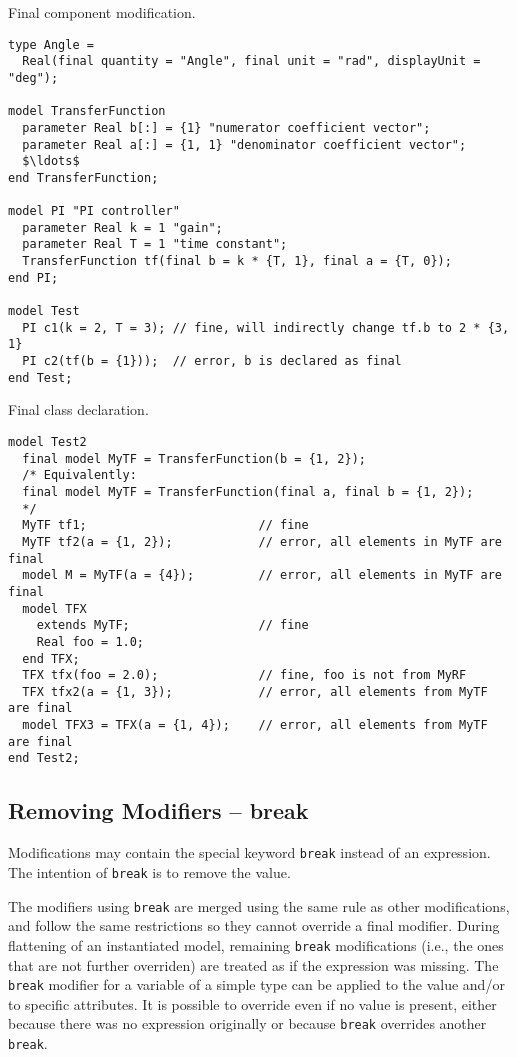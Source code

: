 \begin{example}
Final component modification.
\begin{lstlisting}[language=modelica]
type Angle =
  Real(final quantity = "Angle", final unit = "rad", displayUnit = "deg");

model TransferFunction
  parameter Real b[:] = {1} "numerator coefficient vector";
  parameter Real a[:] = {1, 1} "denominator coefficient vector";
  $\ldots$
end TransferFunction;

model PI "PI controller"
  parameter Real k = 1 "gain";
  parameter Real T = 1 "time constant";
  TransferFunction tf(final b = k * {T, 1}, final a = {T, 0});
end PI;

model Test
  PI c1(k = 2, T = 3); // fine, will indirectly change tf.b to 2 * {3, 1}
  PI c2(tf(b = {1}));  // error, b is declared as final
end Test;
\end{lstlisting}
\end{example}

\begin{example}
Final class declaration.
\begin{lstlisting}[language=modelica]
model Test2
  final model MyTF = TransferFunction(b = {1, 2});
  /* Equivalently:
  final model MyTF = TransferFunction(final a, final b = {1, 2});
  */
  MyTF tf1;                        // fine
  MyTF tf2(a = {1, 2});            // error, all elements in MyTF are final
  model M = MyTF(a = {4});         // error, all elements in MyTF are final
  model TFX
    extends MyTF;                  // fine
    Real foo = 1.0;
  end TFX;
  TFX tfx(foo = 2.0);              // fine, foo is not from MyRF
  TFX tfx2(a = {1, 3});            // error, all elements from MyTF are final
  model TFX3 = TFX(a = {1, 4});    // error, all elements from MyTF are final
end Test2;
\end{lstlisting}
\end{example}

\subsection{Removing Modifiers -- break}\label{removing-modifiers-break}
Modifications may contain the special keyword \lstinline!break! instead of an expression.
The intention of \lstinline!break! is to remove the value.

The modifiers using \lstinline!break! are merged using the same rule as other modifications, and follow the same restrictions so they cannot override a final modifier.
During flattening of an instantiated model, remaining \lstinline!break! modifications (i.e., the ones that are not further overriden) are treated as if the expression was missing.
The \lstinline!break! modifier for a variable of a simple type can be applied to the value and/or to specific attributes.
It is possible to override even if no value is present, either because there was no expression originally or because \lstinline!break! overrides another \lstinline!break!.

